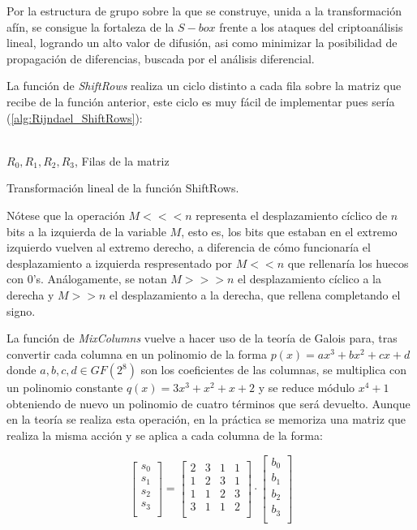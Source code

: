Por la estructura de grupo sobre la que se construye, unida a la transformación afín, se consigue la fortaleza de la $S-box$ frente a los ataques del criptoanálisis lineal, logrando un alto valor de difusión, asi como minimizar la posibilidad de propagación de diferencias, buscada por el análisis diferencial\cite{Rijndael_design}.

La función de \textit{ShiftRows} realiza un ciclo distinto a cada fila sobre la matriz que recibe de la función anterior, este ciclo es muy fácil de implementar pues sería (\ref{alg:Rijndael_ShiftRows}):

\begin{algorithm}[H]
	\begin{algorithmic}[1]
		\REQUIRE \ \\
			\texttt{$R_0, R_1, R_2, R_3$}, Filas de la matriz\\
		\ENDFOR
	\end{algorithmic}
	\caption{Transformación lineal de la función ShiftRows.}
		\label{alg:Rijndael_ShiftRows}
\end{algorithm}

Nótese que la operación $M <<< n$ representa el desplazamiento cíclico de $n$ bits a la izquierda de la variable $M$, esto es, los bits que estaban en el extremo izquierdo vuelven al extremo derecho, a diferencia de cómo funcionaría el desplazamiento a izquierda respresentado por $M << n$ que rellenaría los huecos con 0's. Análogamente, se notan $M >>> n$ el desplazamiento cíclico a la derecha y $M >> n$ el desplazamiento a la derecha, que rellena completando el signo.

La función de \textit{MixColumns} vuelve a hacer uso de la teoría de Galois para, tras convertir cada columna en un polinomio de la forma $p(x) = ax^3 + bx^2 + cx + d$ donde $a, b, c, d \in \textit{GF}(2^8)$ son los coeficientes de las columnas, se multiplica con un polinomio constante $q(x) = 3x^3 + x^2 + x + 2$ y se reduce módulo $x^4 + 1$ obteniendo de nuevo un polinomio de cuatro términos que será devuelto. Aunque en la teoría se realiza esta operación, en la práctica se memoriza una matriz que realiza la misma acción y se aplica a cada columna de la forma:

$$\begin{bmatrix}
    s_0 \\
    s_1 \\
    s_2 \\
    s_3 \\
\end{bmatrix} =
\begin{bmatrix}
    2 & 3 & 1 & 1 \\
    1 & 2 & 3 & 1 \\
    1 & 1 & 2 & 3 \\
    3 & 1 & 1 & 2 \\
\end{bmatrix} \cdot
\begin{bmatrix}
    b_0 \\
    b_1 \\
    b_2 \\
    b_3 \\
\end{bmatrix}$$

